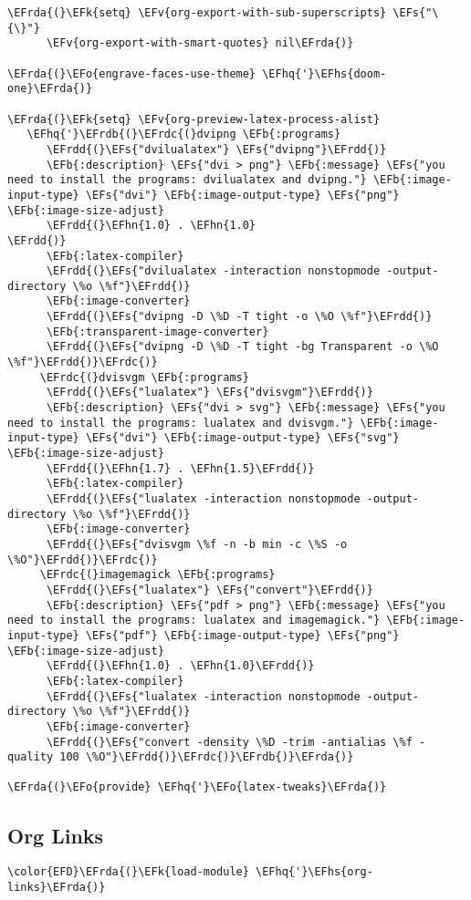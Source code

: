 \documentclass[a4wide,10pt]{article}
\newcommand{\EFs}[1]{\textcolor{EFs}{#1}} %
\newcommand{\EFk}[1]{\textcolor{EFk}{#1}} %
\newcommand{\EFb}[1]{\textcolor{EFb}{#1}} %
\newcommand{\EFv}[1]{\textcolor{EFv}{#1}} %
\newcommand{\EFo}[1]{\textcolor{EFo}{#1}} %
\newcommand{\EFhn}[1]{\textcolor{EFhn}{\textbf{#1}}} %
\newcommand{\EFhq}[1]{\textcolor{EFhq}{#1}} %
\newcommand{\EFhs}[1]{\textcolor{EFhs}{#1}} %
\newcommand{\EFrda}[1]{\textcolor{EFrda}{#1}} %
\newcommand{\EFrdb}[1]{\textcolor{EFrdb}{#1}} %
\newcommand{\EFrdc}[1]{\textcolor{EFrdc}{#1}} %
\newcommand{\EFrdd}[1]{\textcolor{EFrdd}{#1}} %
\begin{document}
\begin{Code}
\begin{Verbatim}
\EFrda{(}\EFk{setq} \EFv{org-export-with-sub-superscripts} \EFs{"\{\}"}
      \EFv{org-export-with-smart-quotes} nil\EFrda{)}

\EFrda{(}\EFo{engrave-faces-use-theme} \EFhq{'}\EFhs{doom-one}\EFrda{)}

\EFrda{(}\EFk{setq} \EFv{org-preview-latex-process-alist}
   \EFhq{'}\EFrdb{(}\EFrdc{(}dvipng \EFb{:programs}
      \EFrdd{(}\EFs{"dvilualatex"} \EFs{"dvipng"}\EFrdd{)}
      \EFb{:description} \EFs{"dvi > png"} \EFb{:message} \EFs{"you need to install the programs: dvilualatex and dvipng."} \EFb{:image-input-type} \EFs{"dvi"} \EFb{:image-output-type} \EFs{"png"} \EFb{:image-size-adjust}
      \EFrdd{(}\EFhn{1.0} . \EFhn{1.0}
\EFrdd{)}
      \EFb{:latex-compiler}
      \EFrdd{(}\EFs{"dvilualatex -interaction nonstopmode -output-directory \%o \%f"}\EFrdd{)}
      \EFb{:image-converter}
      \EFrdd{(}\EFs{"dvipng -D \%D -T tight -o \%O \%f"}\EFrdd{)}
      \EFb{:transparent-image-converter}
      \EFrdd{(}\EFs{"dvipng -D \%D -T tight -bg Transparent -o \%O \%f"}\EFrdd{)}\EFrdc{)}
     \EFrdc{(}dvisvgm \EFb{:programs}
      \EFrdd{(}\EFs{"lualatex"} \EFs{"dvisvgm"}\EFrdd{)}
      \EFb{:description} \EFs{"dvi > svg"} \EFb{:message} \EFs{"you need to install the programs: lualatex and dvisvgm."} \EFb{:image-input-type} \EFs{"dvi"} \EFb{:image-output-type} \EFs{"svg"} \EFb{:image-size-adjust}
      \EFrdd{(}\EFhn{1.7} . \EFhn{1.5}\EFrdd{)}
      \EFb{:latex-compiler}
      \EFrdd{(}\EFs{"lualatex -interaction nonstopmode -output-directory \%o \%f"}\EFrdd{)}
      \EFb{:image-converter}
      \EFrdd{(}\EFs{"dvisvgm \%f -n -b min -c \%S -o \%O"}\EFrdd{)}\EFrdc{)}
     \EFrdc{(}imagemagick \EFb{:programs}
      \EFrdd{(}\EFs{"lualatex"} \EFs{"convert"}\EFrdd{)}
      \EFb{:description} \EFs{"pdf > png"} \EFb{:message} \EFs{"you need to install the programs: lualatex and imagemagick."} \EFb{:image-input-type} \EFs{"pdf"} \EFb{:image-output-type} \EFs{"png"} \EFb{:image-size-adjust}
      \EFrdd{(}\EFhn{1.0} . \EFhn{1.0}\EFrdd{)}
      \EFb{:latex-compiler}
      \EFrdd{(}\EFs{"lualatex -interaction nonstopmode -output-directory \%o \%f"}\EFrdd{)}
      \EFb{:image-converter}
      \EFrdd{(}\EFs{"convert -density \%D -trim -antialias \%f -quality 100 \%O"}\EFrdd{)}\EFrdc{)}\EFrdb{)}\EFrda{)}

\EFrda{(}\EFo{provide} \EFhq{'}\EFo{latex-tweaks}\EFrda{)}
\end{Verbatim}
\end{Code}

\subsection{Org Links}
\label{sec:org792cbbc}
\begin{Code}
\begin{Verbatim}
\color{EFD}\EFrda{(}\EFk{load-module} \EFhq{'}\EFhs{org-links}\EFrda{)}
\end{Verbatim}
\end{Code}
\end{document}
